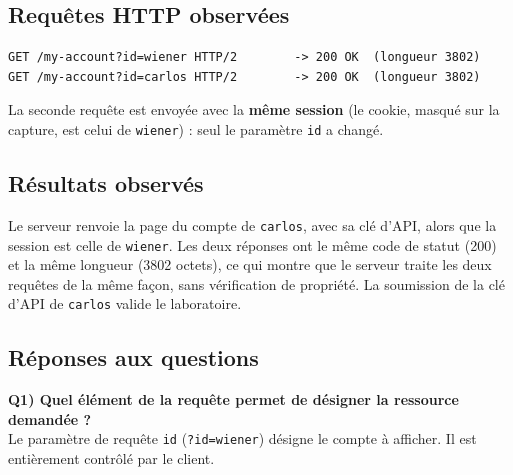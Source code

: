 \documentclass{rapportENSIAS}
\begin{document}


\subsection{Requêtes HTTP observées}

\begin{verbatim}
GET /my-account?id=wiener HTTP/2        -> 200 OK  (longueur 3802)
GET /my-account?id=carlos HTTP/2        -> 200 OK  (longueur 3802)
\end{verbatim}

La seconde requête est envoyée avec la \textbf{même session} (le cookie, masqué sur la capture, est celui de \texttt{wiener}) : seul le paramètre \texttt{id} a changé.




\subsection{Résultats observés}

Le serveur renvoie la page du compte de \texttt{carlos}, avec sa clé d'API, alors que la session est celle de \texttt{wiener}. Les deux réponses ont le même code de statut (200) et la même longueur (3802 octets), ce qui montre que le serveur traite les deux requêtes de la même façon, sans vérification de propriété. La soumission de la clé d'API de \texttt{carlos} valide le laboratoire.

\subsection{Réponses aux questions}

\textbf{Q1) Quel élément de la requête permet de désigner la ressource demandée ?}\\
Le paramètre de requête \texttt{id} (\texttt{?id=wiener}) désigne le compte à afficher. Il est entièrement contrôlé par le client.
\end{document}
